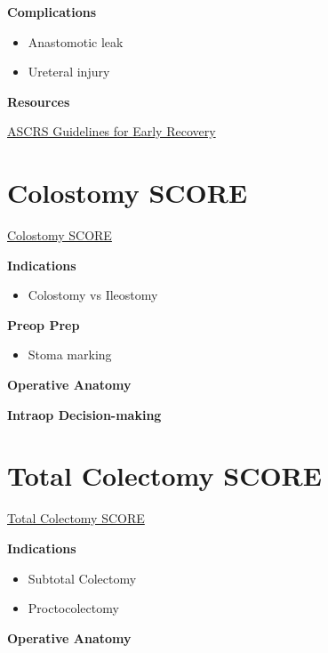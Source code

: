 \documentclass[
]{book}
\providecommand{\tightlist}{%
  \setlength{\itemsep}{0pt}\setlength{\parskip}{0pt}}
\begin{document}
\textbf{Complications}

\begin{itemize}
\tightlist
\item
  Anastomotic leak
\item
  Ureteral injury
\end{itemize}

\textbf{Resources}

\href{https://fascrs.org/ascrs/media/files/downloads/Clinical\%20Practice\%20Guidelines/clinical_practice_guidelines_for_enhanced_recovery-3.pdf}{ASCRS Guidelines for Early Recovery}

\hypertarget{ColostomyObj}{%
\chapter{Colostomy SCORE}\label{ColostomyObj}}

\href{https://www.surgicalcore.org/modulecontent.aspx?id=1000457}{Colostomy SCORE}

\textbf{Indications}

\begin{itemize}
\tightlist
\item
  Colostomy vs Ileostomy
\end{itemize}

\textbf{Preop Prep}

\begin{itemize}
\tightlist
\item
  Stoma marking
\end{itemize}

\textbf{Operative Anatomy}

\textbf{Intraop Decision-making}

\hypertarget{TColectomyObj}{%
\chapter{Total Colectomy SCORE}\label{TColectomyObj}}

\href{https://www.surgicalcore.org/modulecontent.aspx?id=1000583}{Total Colectomy SCORE}

\textbf{Indications}

\begin{itemize}
\tightlist
\item
  Subtotal Colectomy
\item
  Proctocolectomy
\end{itemize}

\textbf{Operative Anatomy}
\end{document}
